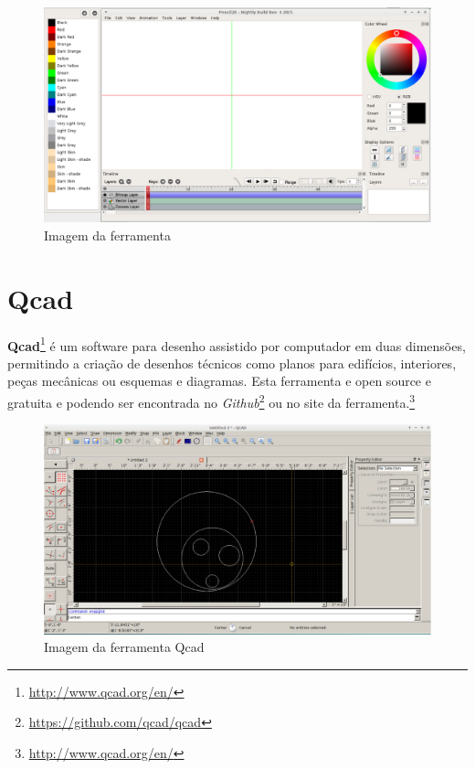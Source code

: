 \begin{apendicesenv}
    \begin{figure}[h]
        \centering
            \includegraphics[scale=0.3]{figuras/pencil2D.eps}
        \caption{Imagem da ferramenta }
        \label{ferramenta_pencil2D}
    \end{figure}

\section{Qcad}
\label{projeto_qcad_apendice}
    \textbf{Qcad}\footnote{\url{http://www.qcad.org/en/}} é um software para desenho
 assistido por computador em duas dimensões, permitindo a criação de desenhos técnicos como
 planos para edifícios, interiores, peças mecânicas ou esquemas e diagramas. Esta ferramenta
 e open source  e gratuita e podendo ser encontrada
 no \textit{Github}\footnote{\url{https://github.com/qcad/qcad}} ou no site
 da ferramenta.\footnote{\url{http://www.qcad.org/en/}}

    \begin{figure}[h]
        \centering
            \includegraphics[scale=0.3]{figuras/qcad.eps}
        \caption{Imagem da ferramenta Qcad}
        \label{ferramenta_qcad}
    \end{figure}


\end{apendicesenv}
